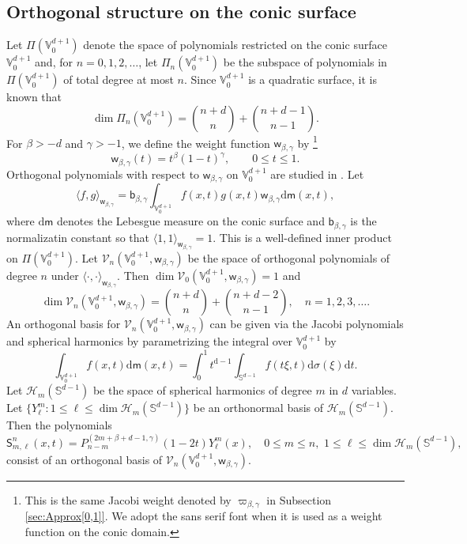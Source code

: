 \documentclass{amsart}
\theoremstyle{remark}
\def\la{{\langle}}
\def\ra{{\rangle}}
\def\d{\mathrm{d}}
\def\sph{{\mathbb{S}^{d-1}}}
\def\b{{\beta}}
\def\g{{\gamma}}
\def\s{\sigma}
\def\la{{\langle}}
\def\ra{{\rangle}}
\def\CH{{\mathcal H}}
\def\CV{{\mathcal V}}
\def\VV{{\mathbb V}}
\def\la{{\langle}}
\def\ra{{\rangle}}
\def\d{\mathrm{d}}
\def\sph{{\mathbb{S}^{d-1}}}
\def\sS{{\mathsf S}}
\def\sb{{\mathsf b}}
\def\sm{{\mathsf m}}
\def\sw{{\mathsf w}}
\def\b{{\beta}}
\def\g{{\gamma}}
\def\s{\sigma}
\def\la{{\langle}}
\def\ra{{\rangle}}
\def\CH{{\mathcal H}}
\def\CV{{\mathcal V}}
\def\VV{{\mathbb V}}
\begin{document}
\subsection{Orthogonal structure on the conic surface}
Let $\Pi(\VV_0^{d+1})$ denote the space of polynomials restricted on the conic surface $\VV_0^{d+1}$
and, for $n = 0,1,2,\ldots$, let $\Pi_n(\VV_0^{d+1})$ be the subspace of polynomials in $\Pi(\VV_0^{d+1})$
of total degree at most $n$. Since $\VV_0^{d+1}$ is a quadratic surface, it is known that
$$
 \dim \Pi_n (\VV_0^{d+1}) = \binom{n+d}{n}+\binom{n+d-1}{n-1}.
$$
For $\b > - d$ and $\g > -1$, we define the weight function $\sw_{\b,\g}$ by  \footnote{This is the same Jacobi weight 
denoted by $\varpi_{\b,\g}$ in Subsection \ref{sec:Approx[0,1]}. We adopt the sans serif font when it is used as 
a weight function on the conic domain.}
$$
   \sw_{\b,\g}(t) = t^\b (1-t)^\g, \qquad 0 \le t \le 1.
$$
Orthogonal polynomials with respect to $ \sw_{\b,\g}$ on $\VV_0^{d+1}$ are studied in \cite{X20}. Let 
$$
\la f, g\ra_{\sw_{\b,\g}} =\sb_{\b,\g} \int_{\VV_0^{d+1}} f(x,t) g(x,t) \sw_{\b,\g} \d \sm(x,t),
$$ 
where $\d \sm$ denotes the Lebesgue measure on the conic surface and $\sb_{\b,\g}$ is the normalizatin
constant so that $\la 1,1\ra_{\sw_{\b,\g}}=1$. This is a well-defined inner product 
on $\Pi(\VV_0^{d+1})$. Let $\CV_n(\VV_0^{d+1},\sw_{\b,\g})$ be the space of orthogonal polynomials of degree 
$n$ under $\la \cdot, \cdot\ra_{\sw_{\b,\g}}$. Then $\dim \CV_0(\VV_0^{d+1},\sw_{\b,\g}) =1$ and 
$$
   \dim \CV_n(\VV_0^{d+1},\sw_{\b,\g})  = \binom{n+d}{n}+\binom{n+d-2}{n-1},\quad n=1,2,3,\ldots.
$$
An orthogonal basis for $\CV_n(\VV_0^{d+1},\sw_{\b,\g})$ can be given via the Jacobi polynomials and 
spherical harmonics by parametrizing the integral over $\VV_0^{d+1}$ by 
\begin{equation}\label{eq:intV0}
   \int_{\VV_0^{d+1}} f(x,t) \d \sm(x,t) = \int_0^1 t^{\d-1} \int_{\sph} f(t\xi, t) \d \s(\xi)\d t. 
\end{equation}  
Let $\CH_m(\sph)$ be the space of spherical harmonics of degree $m$ in $d$ variables. Let 
$\{Y_\ell^m: 1 \le \ell \le \dim \CH_m(\sph)\}$ be an orthonormal basis of $\CH_m(\sph)$. Then the polynomials
\begin{equation*} %
  \sS_{m, \ell}^n (x,t) = P_{n-m}^{(2m + \b + d-1,\g)} (1-2t) Y_\ell^m (x), \quad 0 \le m \le n, \,\, 
      1 \le \ell \le \dim \CH_m(\sph),
\end{equation*}
consist of an orthogonal basis of $\CV_n(\VV_0^{d+1}, \sw_{\b,\g})$. 
\end{document}
